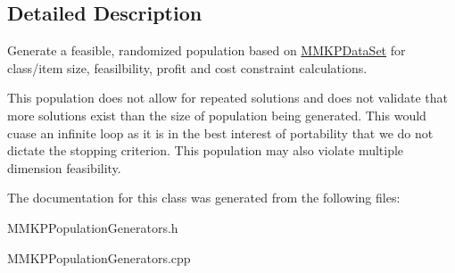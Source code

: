 \subsection{Detailed Description}
Generate a feasible, randomized population based on \hyperlink{class_m_m_k_p_data_set}{M\+M\+K\+P\+Data\+Set} for class/item size, feasilbility, profit and cost constraint calculations. 

This population does not allow for repeated solutions and does not validate that more solutions exist than the size of population being generated. This would cuase an infinite loop as it is in the best interest of portability that we do not dictate the stopping criterion. This population may also violate multiple dimension feasibility. 

The documentation for this class was generated from the following files\+:\begin{DoxyCompactItemize}
\item 
M\+M\+K\+P\+Population\+Generators.\+h\item 
M\+M\+K\+P\+Population\+Generators.\+cpp\end{DoxyCompactItemize}
